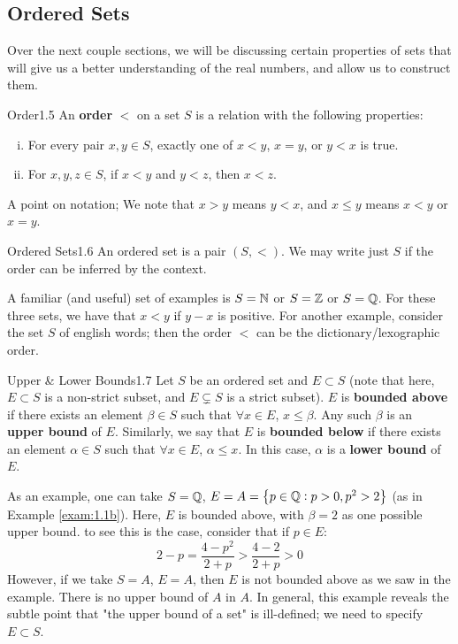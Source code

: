 \subsection{Ordered Sets}
Over the next couple sections, we will be discussing certain properties of sets that will give us a better understanding of the real numbers, and allow us to construct them.

\setcounter{rudin}{4}

\begin{definition}{Order}{1.5}
    An \textbf{order} $<$ on a set $S$ is a relation with the following properties:
    \begin{enumerate}[(i)]
        \item For every pair $x, y \in S$, exactly one of $x < y$, $x = y$, or $y < x$ is true. 
        \item For $x, y, z \in S$, if $x < y$ and $y < z$, then $x < z$. 
    \end{enumerate}
    A point on notation; We note that $x > y$ means $y < x$, and $x \leq y$ means $x < y$ or $x = y$. 
\end{definition}

\begin{definition}{Ordered Sets}{1.6}
    An ordered set is a pair $(S, <)$. We may write just $S$ if the order can be inferred by the context.
\end{definition}
\noindent A familiar (and useful) set of examples is $S = \mathbb{N}$ or $S = \mathbb{Z}$ or $S = \mathbb{Q}$. For these three sets, we have that $x < y$ if $y-x$ is positive. For another example, consider the set $S$ of english words; then the order $<$ can be the dictionary/lexographic order. 

\begin{definition}{Upper \& Lower Bounds}{1.7}
    Let $S$ be an ordered set and $E \subset S$ (note that here, $E \subset S$ is a non-strict subset, and $E \subsetneq S$ is a strict subset). $E$ is \textbf{bounded above} if there exists an element $\beta \in S$ such that $\forall x \in E$, $x \leq \beta$. Any such $\beta$ is an \textbf{upper bound} of $E$. Similarly, we say that $E$ is \textbf{bounded below} if there exists an element $\alpha \in S$ such that $\forall x \in E$, $\alpha \leq x$. In this case, $\alpha$ is a \textbf{lower bound} of $E$.
\end{definition}
\noindent As an example, one can take $S = \mathbb{Q}$, $E = A = \set{p \in \mathbb{Q}: p > 0, p^2 > 2}$ (as in Example \ref{exam:1.1b}). Here, $E$ is bounded above, with $\beta = 2$ as one possible upper bound. to see this is the case, consider that if $p \in E$:
\[2 - p = \frac{4 - p^2}{2+p} > \frac{4-2}{2+p} > 0\]
\noindent However, if we take $S = A$, $E = A$, then $E$ is not bounded above as we saw in the example. There is no upper bound of $A$ in $A$. In general, this example reveals the subtle point that "the upper bound of a set" is ill-defined; we need to specify $E \subset S$. 

